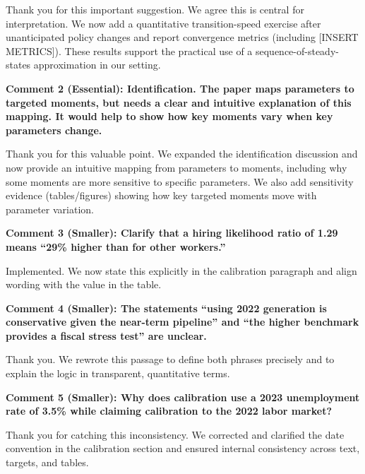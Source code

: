 \documentclass[12pt]{article}
\begin{document}
\begin{onehalfspacing}
\medskip

Thank you for this important suggestion. We agree this is central for interpretation. We now add a quantitative transition-speed exercise after unanticipated policy changes and report convergence metrics (including [INSERT METRICS]). These results support the practical use of a sequence-of-steady-states approximation in our setting.

\bigskip
\bigskip

\textbf{Comment 2 (Essential): Identification. The paper maps parameters to targeted moments, but needs a clear and intuitive explanation of this mapping. It would help to show how key moments vary when key parameters change.}

\medskip

Thank you for this valuable point. We expanded the identification discussion and now provide an intuitive mapping from parameters to moments, including why some moments are more sensitive to specific parameters. We also add sensitivity evidence (tables/figures) showing how key targeted moments move with parameter variation.

\bigskip
\bigskip

\textbf{Comment 3 (Smaller): Clarify that a hiring likelihood ratio of 1.29 means ``29\% higher than for other workers.''}

\medskip

Implemented. We now state this explicitly in the calibration paragraph and align wording with the value in the table.

\bigskip
\bigskip

\textbf{Comment 4 (Smaller): The statements ``using 2022 generation is conservative given the near-term pipeline'' and ``the higher benchmark provides a fiscal stress test'' are unclear.}

\medskip

Thank you. We rewrote this passage to define both phrases precisely and to explain the logic in transparent, quantitative terms.

\bigskip
\bigskip

\textbf{Comment 5 (Smaller): Why does calibration use a 2023 unemployment rate of 3.5\% while claiming calibration to the 2022 labor market?}

\medskip

Thank you for catching this inconsistency. We corrected and clarified the date convention in the calibration section and ensured internal consistency across text, targets, and tables.


\end{onehalfspacing}
\end{document}
